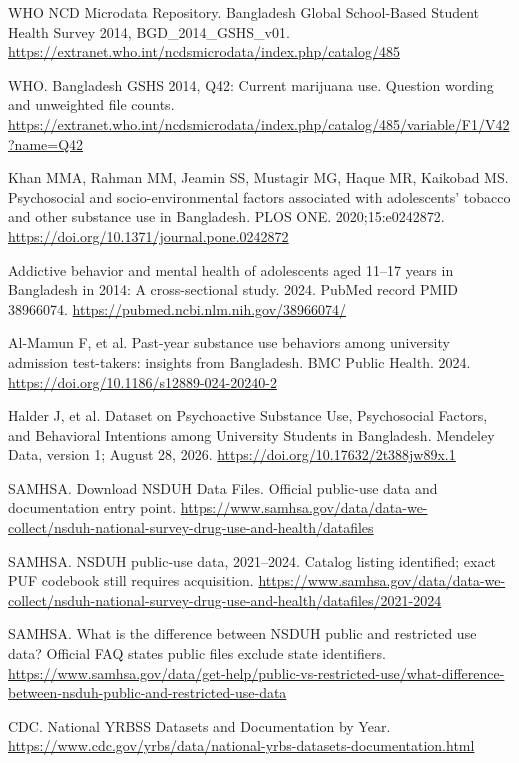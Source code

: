 \documentclass[10pt]{article}
\begin{document}
\begin{enumerate}[label={[\arabic*]},itemsep=7pt]
\item WHO NCD Microdata Repository. Bangladesh Global School-Based Student Health Survey 2014, BGD\_2014\_GSHS\_v01. \url{https://extranet.who.int/ncdsmicrodata/index.php/catalog/485}
\item WHO. Bangladesh GSHS 2014, Q42: Current marijuana use. Question wording and unweighted file counts. \url{https://extranet.who.int/ncdsmicrodata/index.php/catalog/485/variable/F1/V42?name=Q42}
\item Khan MMA, Rahman MM, Jeamin SS, Mustagir MG, Haque MR, Kaikobad MS. Psychosocial and socio-environmental factors associated with adolescents' tobacco and other substance use in Bangladesh. PLOS ONE. 2020;15:e0242872. \url{https://doi.org/10.1371/journal.pone.0242872}
\item Addictive behavior and mental health of adolescents aged 11--17 years in Bangladesh in 2014: A cross-sectional study. 2024. PubMed record PMID 38966074. \url{https://pubmed.ncbi.nlm.nih.gov/38966074/}
\item Al-Mamun F, et al. Past-year substance use behaviors among university admission test-takers: insights from Bangladesh. BMC Public Health. 2024. \url{https://doi.org/10.1186/s12889-024-20240-2}
\item Halder J, et al. Dataset on Psychoactive Substance Use, Psychosocial Factors, and Behavioral Intentions among University Students in Bangladesh. Mendeley Data, version 1; August 28, 2026. \url{https://doi.org/10.17632/2t388jw89x.1}
\item SAMHSA. Download NSDUH Data Files. Official public-use data and documentation entry point. \url{https://www.samhsa.gov/data/data-we-collect/nsduh-national-survey-drug-use-and-health/datafiles}
\item SAMHSA. NSDUH public-use data, 2021--2024. Catalog listing identified; exact PUF codebook still requires acquisition. \url{https://www.samhsa.gov/data/data-we-collect/nsduh-national-survey-drug-use-and-health/datafiles/2021-2024}
\item SAMHSA. What is the difference between NSDUH public and restricted use data? Official FAQ states public files exclude state identifiers. \url{https://www.samhsa.gov/data/get-help/public-vs-restricted-use/what-difference-between-nsduh-public-and-restricted-use-data}
\item CDC. National YRBSS Datasets and Documentation by Year. \url{https://www.cdc.gov/yrbs/data/national-yrbs-datasets-documentation.html}

\end{enumerate}
\end{document}
